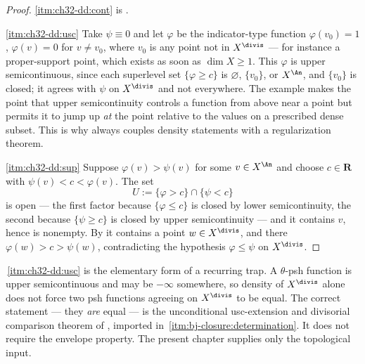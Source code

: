 \begin{proof}
\cref{itm:ch32-dd:cont} is .

\cref{itm:ch32-dd:usc}  Take $\psi\equiv0$ and let $\varphi$ be the
indicator-type function $\varphi(v_0)=1$, $\varphi(v)=0$ for
$v\neq v_0$, where $v_0$ is any point not in $X^{\divis}$ --- for
instance a proper-support point, which exists as soon as $\dim X\geq1$.
This $\varphi$ is upper semicontinuous, since each superlevel set
$\{\varphi\geq c\}$ is $\varnothing$, $\{v_0\}$, or $X^{\An}$, and
$\{v_0\}$ is closed; it agrees with $\psi$ on $X^{\divis}$ and not
everywhere.  The example makes the point that upper semicontinuity controls
a function from above near a point but permits it to jump up \emph{at} the
point relative to the values on a prescribed dense subset.  This is why
 always couples density statements with a regularization
theorem.

\cref{itm:ch32-dd:sup}  Suppose $\varphi(v)>\psi(v)$ for some
$v\in X^{\An}$ and choose $c\in\mathbf R$ with
$\psi(v)<c<\varphi(v)$.  The set
\[
 U:=\{\varphi>c\}\cap\{\psi<c\}
\]
is open --- the first factor because $\{\varphi\leq c\}$ is closed by lower
semicontinuity, the second because $\{\psi\geq c\}$ is closed by upper
semicontinuity --- and it contains $v$, hence is nonempty.  By
 it contains a point
$w\in X^{\divis}$, and there $\varphi(w)>c>\psi(w)$, contradicting the
hypothesis $\varphi\leq\psi$ on $X^{\divis}$.
\end{proof}

\begin{remark}
\label{rem:ch32-density-not-enough}
\,\cref{itm:ch32-dd:usc} is the
elementary form of a recurring trap.  A $\theta$-psh function is upper
semicontinuous and may be $-\infty$ somewhere, so density of
$X^{\divis}$ alone does not force two psh functions agreeing on
$X^{\divis}$ to be equal.  The correct statement --- they \emph{are}
equal --- is the unconditional usc-extension and divisorial comparison
theorem of \cite[Theorem~4.22 and Corollary~4.23]{BJ22}, imported in
\,\cref{itm:bj-closure:determination}.  It does
not require the envelope property.  The present chapter supplies only the
topological input.
\end{remark}

